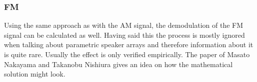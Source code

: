 %
%
%
%
%

%

\subsubsection*{FM}

Using the same approach as with the AM signal, the demodulation of the FM signal can be calculated as well. Having said this the process is mostly ignored when talking about parametric speaker arrays and therefore information about it is quite rare. Usually the effect is only verified empirically. The paper of Masato Nakayama and Takanobu Nishiura gives an idea on how the mathematical solution might look.\cite{nakayama_synchronized_2017}

